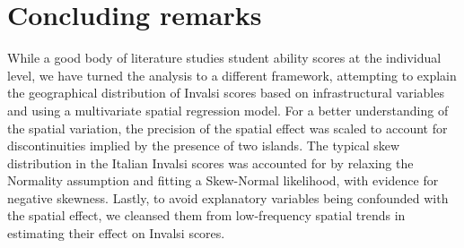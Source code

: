 \documentclass[openany]{book}
\begin{document}
\begin{table}[ht]
\caption{Posterior summaries of hyperparameters when $z$ is defined as a province-level ICAR, under the base model and the Spatial+2.0 model (optimal combination of eigenvector removal under the WAIC metric)}
\label{tab:hyperpar}
\end{table}

\section{Concluding remarks}

While a good body of literature studies student ability scores at the individual level, we have turned the analysis to a different framework, attempting to explain the geographical distribution of Invalsi scores based on infrastructural variables and using a multivariate spatial regression model. For a better understanding of the spatial variation, the precision of the spatial effect was scaled to account for discontinuities implied by the presence of two islands. The typical skew distribution in the Italian Invalsi scores was accounted for by relaxing the Normality assumption and fitting a Skew-Normal likelihood, with evidence for negative skewness. Lastly, to avoid explanatory variables being confounded with the spatial effect, we cleansed them from low-frequency spatial trends in estimating their effect on Invalsi scores.
\end{document}
